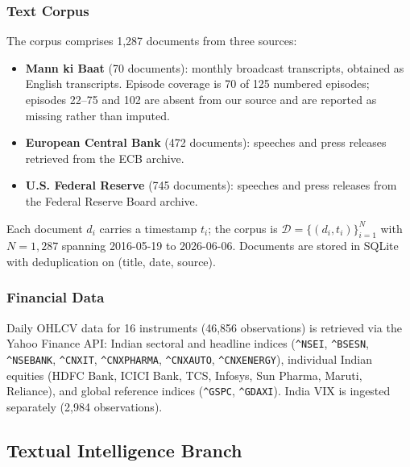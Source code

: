 \documentclass[11pt]{article}
\begin{document}
\subsubsection{Text Corpus}
The corpus comprises 1{,}287 documents from three sources:
\begin{itemize}[leftmargin=*, itemsep=0pt, topsep=4pt]
    \item \textbf{Mann ki Baat} (70 documents): monthly broadcast transcripts, obtained as English transcripts. Episode coverage is 70 of 125 numbered episodes; episodes 22--75 and 102 are absent from our source and are reported as missing rather than imputed.
    \item \textbf{European Central Bank} (472 documents): speeches and press releases retrieved from the ECB archive.
    \item \textbf{U.S. Federal Reserve} (745 documents): speeches and press releases from the Federal Reserve Board archive.
\end{itemize}
Each document $d_i$ carries a timestamp $t_i$; the corpus is $\mathcal{D} = \{(d_i, t_i)\}_{i=1}^{N}$ with $N = 1{,}287$ spanning 2016-05-19 to 2026-06-06. Documents are stored in SQLite with deduplication on (title, date, source).

\subsubsection{Financial Data}
Daily OHLCV data for 16 instruments (46{,}856 observations) is retrieved via the Yahoo Finance API: Indian sectoral and headline indices (\texttt{\^{}NSEI}, \texttt{\^{}BSESN}, \texttt{\^{}NSEBANK}, \texttt{\^{}CNXIT}, \texttt{\^{}CNXPHARMA}, \texttt{\^{}CNXAUTO}, \texttt{\^{}CNXENERGY}), individual Indian equities (HDFC Bank, ICICI Bank, TCS, Infosys, Sun Pharma, Maruti, Reliance), and global reference indices (\texttt{\^{}GSPC}, \texttt{\^{}GDAXI}). India VIX is ingested separately (2{,}984 observations).

\subsection{Textual Intelligence Branch}
\end{document}
